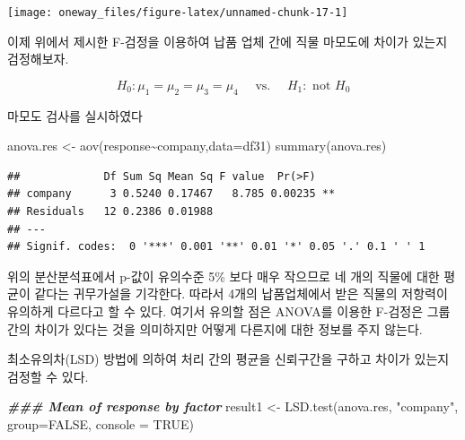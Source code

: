 \documentclass[
]{book}
\newenvironment{Shaded}{\begin{snugshade}}{\end{snugshade}}
\newcommand{\AttributeTok}[1]{\textcolor[rgb]{0.77,0.63,0.00}{#1}}
\newcommand{\ConstantTok}[1]{\textcolor[rgb]{0.00,0.00,0.00}{#1}}
\newcommand{\DocumentationTok}[1]{\textcolor[rgb]{0.56,0.35,0.01}{\textbf{\textit{#1}}}}
\newcommand{\FunctionTok}[1]{\textcolor[rgb]{0.00,0.00,0.00}{#1}}
\newcommand{\NormalTok}[1]{#1}
\newcommand{\OtherTok}[1]{\textcolor[rgb]{0.56,0.35,0.01}{#1}}
\newcommand{\SpecialCharTok}[1]{\textcolor[rgb]{0.00,0.00,0.00}{#1}}
\newcommand{\StringTok}[1]{\textcolor[rgb]{0.31,0.60,0.02}{#1}}
\begin{document}
\begin{center}\texttt{[image: oneway\_files/figure-latex/unnamed-chunk-17-1]} \end{center}

이제 위에서 제시한 F-검정을 이용하여 납품 업체 간에 직물 마모도에 차이가 있는지 검정해보자.

\[ H_0: \mu_1=\mu_2=\mu_3=\mu_4 \quad \text{ vs. }\quad H_1: \text{ not } H_0 \]

마모도 검사를 실시하였다

\begin{Shaded}
\begin{Highlighting}[]
\NormalTok{anova.res }\OtherTok{\textless{}{-}} \FunctionTok{aov}\NormalTok{(response}\SpecialCharTok{\textasciitilde{}}\NormalTok{company,}\AttributeTok{data=}\NormalTok{df31) }
\FunctionTok{summary}\NormalTok{(anova.res)}
\end{Highlighting}
\end{Shaded}

\begin{verbatim}
##             Df Sum Sq Mean Sq F value  Pr(>F)   
## company      3 0.5240 0.17467   8.785 0.00235 **
## Residuals   12 0.2386 0.01988                   
## ---
## Signif. codes:  0 '***' 0.001 '**' 0.01 '*' 0.05 '.' 0.1 ' ' 1
\end{verbatim}

위의 분산분석표에서 p-값이 유의수준 5\% 보다 매우 작으므로 네 개의 직물에 대한 평균이 같다는 귀무가설을 기각한다. 따라서 4개의 납품업체에서 받은 직물의 저항력이 유의하게 다르다고 할 수 있다. 여기서 유의할 점은 ANOVA를 이용한 F-검정은 그룹 간의 차이가 있다는 것을 의미하지만 어떻게 다른지에 대한 정보를 주지 않는다.

최소유의차(LSD) 방법에 의하여 처리 간의 평균을 신뢰구간을 구하고 차이가 있는지 검정할 수 있다.

\begin{Shaded}
\begin{Highlighting}[]
\DocumentationTok{\#\#\# Mean of response by factor}
\NormalTok{result1 }\OtherTok{\textless{}{-}} \FunctionTok{LSD.test}\NormalTok{(anova.res, }\StringTok{"company"}\NormalTok{, }\AttributeTok{group=}\ConstantTok{FALSE}\NormalTok{, }\AttributeTok{console =} \ConstantTok{TRUE}\NormalTok{)}
\end{Highlighting}
\end{Shaded}
\end{document}
